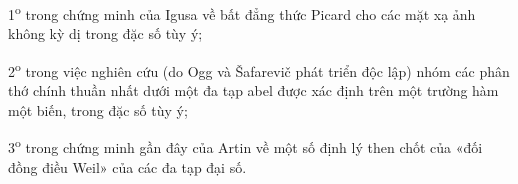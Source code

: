 1\textsuperscript{o} trong chứng minh của Igusa về bất đẳng thức Picard cho
các mặt xạ ảnh không kỳ dị trong đặc số tùy ý;

2\textsuperscript{o} trong việc nghiên cứu (do Ogg và Šafarevič phát triển độc
lập) nhóm các phân thớ chính thuần nhất dưới một đa tạp abel được xác định trên
một trường hàm một biến, trong đặc số tùy ý;

3\textsuperscript{o} trong chứng minh gần đây của Artin về một số định lý then
chốt của «đối đồng điều Weil» của các đa tạp đại số.

\par
